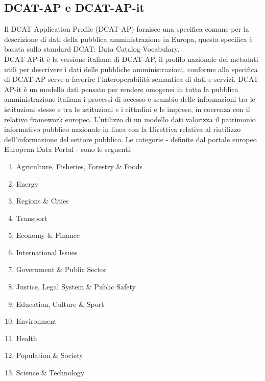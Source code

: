 \documentclass{article}
\theoremstyle{plain}
\theoremstyle{definition}
\begin{document}
\newpage
\subsection{DCAT-AP e DCAT-AP-it}

Il DCAT Application Profile (DCAT-AP) fornisce una specifica comune per la descrizione di dati della pubblica amministrazione in Europa, questa specifica è basata sullo standard DCAT: Data Catalog Vocabulary. \footnotemark
{}
\\
DCAT-AP-it è la versione italiana di DCAT-AP, il profilo nazionale dei metadati utili per descrivere i dati delle pubbliche amministrazioni, conforme alla specifica di DCAT-AP serve a favorire l'interoperabilità semantica di dati e servizi. DCAT-AP-it è un modello dati pensato per rendere omogenei in tutta la pubblica amministrazione italiana i processi di accesso e scambio delle informazioni tra le istituzioni stesse e tra le istituzioni e i cittadini e le imprese, in coerenza con il relativo framework europeo. L'utilizzo di un modello dati valorizza il patrimonio informativo pubblico nazionale in linea con la Direttiva relativa al riutilizzo dell'informazione del settore pubblico.
Le categorie - definite dal portale europeo European Data Portal - sono le seguenti:

\begin{enumerate}
\item Agriculture, Fisheries, Forestry \& Foods
\item Energy
\item Regions \& Cities
\item Transport
\item Economy \& Finance
\item International Issues
\item Government \& Public Sector
\item Justice, Legal System \& Public Safety
\item Education, Culture \& Sport
\item Environment
\item Health
\item Population \& Society
\item Science \& Technology
\end{enumerate}
\end{document}

